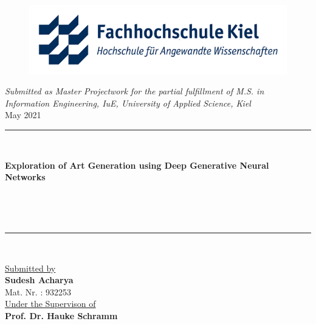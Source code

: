 \documentclass[]{report} %
\begin{document}
\pagestyle{empty}
\frontmatter %


\begin{titlepage}
	\begin{center}
		\vfill
		
		
		\FloatBarrier
		\begin{figure}[h]
			\includegraphics[width=\textwidth]{fh_kiel_logo.png}
		\end{figure} 
		\FloatBarrier
		\vspace*{2\baselineskip}
		
		{\large \textit{ Submitted as Master Projectwork for the partial fulfillment of M.S. in Information Engineering, IuE, University of Applied Science, Kiel }}\\[2cm]
		
		\center \Large{May 2021}\\[1.5cm]		
		
		\rule{\textwidth}{2.5pt}\\[0cm]
		{\huge \bfseries {Exploration of Art Generation using Deep Generative Neural Networks } \par \ }\\[-0.5cm]
		\rule{\textwidth}{2.5pt}\\[1cm]
		
		\vfill
		
		\hfill \large \underline{Submitted by}\\[0.5cm] \hfill
		\hfill  {\large \textbf{Sudesh Acharya}}\\ [0.1cm]
		\hfill  {\large{Mat. Nr. : 932253}}\\ [2cm]
		
		\hfill \large \underline{Under the Supervison of  }\\[0.5cm]
		\hfill  {\large \textbf{Prof. Dr. Hauke Schramm}}\\ [0.1cm]

	\end{center}
\end{titlepage}
\end{document}
